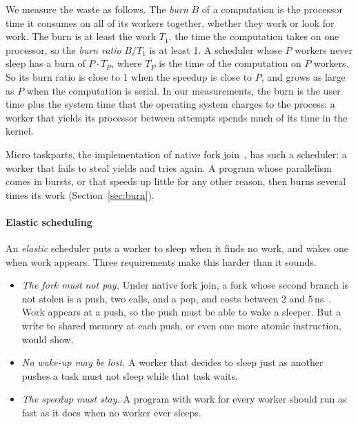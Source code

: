 \documentclass[sigplan,nonacm]{acmart}
\begin{document}
We measure the waste as follows.
%
The \emph{burn} $B$ of a computation is the processor time it consumes
on all of its workers together, whether they work or look for work.
%
The burn is at least the work $T_1$, the time the computation takes on
one processor, so the \emph{burn ratio} $B / T_1$ is at least 1.
%
A scheduler whose $P$ workers never sleep has a burn of $P \cdot T_P$,
where $T_P$ is the time of the computation on $P$ workers.
%
So its burn ratio is close to 1 when the speedup is close to $P$, and
grows as large as $P$ when the computation is serial.
%
In our measurements, the burn is the user time plus the system time
that the operating system charges to the process: a worker that yields
its processor between attempts spends much of its time in the kernel.

Micro taskparts, the implementation of native fork
join~\cite{nativeforkjoin}, has such a scheduler: a worker that fails
to steal yields and tries again.
%
A program whose parallelism comes in bursts, or that speeds up
little for any other reason, then burns several times its work
(Section~\ref{sec:burn}).

\paragraph{Elastic scheduling}
%
An \emph{elastic} scheduler puts a worker to sleep when it finds no
work, and wakes one when work appears.
%
Three requirements make this harder than it sounds.

\begin{itemize}[leftmargin=*]
\item \emph{The fork must not pay.}
  Under native fork join, a fork whose second branch is not stolen is
  a push, two calls, and a pop, and costs between 2 and
  5\,ns~\cite{nativeforkjoin}.
  Work appears at a push, so the push must be able to wake a sleeper.
  But a write to shared memory at each push, or even one more atomic
  instruction, would show.
\item \emph{No wake-up may be lost.}
  A worker that decides to sleep just as another pushes a task must
  not sleep while that task waits.
\item \emph{The speedup must stay.}
  A program with work for every worker should run as fast as it does
  when no worker ever sleeps.
\end{itemize}
\end{document}
